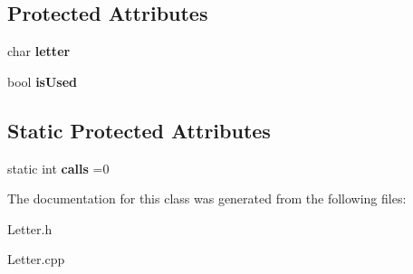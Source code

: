 \subsection*{Protected Attributes}
\begin{DoxyCompactItemize}
\item 
\hypertarget{class_letter_add29e231aa209f890a891ea202dbff4a}{}\label{class_letter_add29e231aa209f890a891ea202dbff4a} 
char {\bfseries letter}
\item 
\hypertarget{class_letter_ad1996ff2106ebfad001df34fd2484a0a}{}\label{class_letter_ad1996ff2106ebfad001df34fd2484a0a} 
bool {\bfseries is\+Used}
\end{DoxyCompactItemize}
\subsection*{Static Protected Attributes}
\begin{DoxyCompactItemize}
\item 
\hypertarget{class_letter_a8cb651b8860e525ee90780e5915d9955}{}\label{class_letter_a8cb651b8860e525ee90780e5915d9955} 
static int {\bfseries calls} =0
\end{DoxyCompactItemize}


The documentation for this class was generated from the following files\+:\begin{DoxyCompactItemize}
\item 
Letter.\+h\item 
Letter.\+cpp\end{DoxyCompactItemize}
